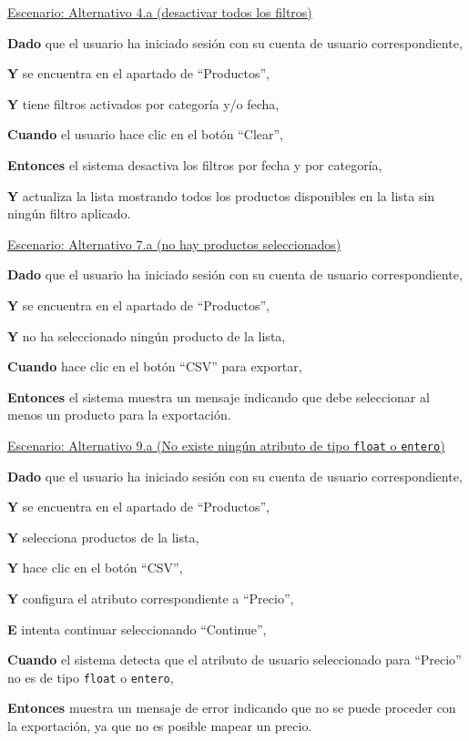 \vspace{0.20cm}

\underline{Escenario: Alternativo 4.a (desactivar todos los filtros)}\par
\vspace{0.15cm}
\textbf{Dado} que el usuario ha iniciado sesión con su cuenta de usuario correspondiente,\par
\textbf{Y} se encuentra en el apartado de \enquote{Productos},\par
\textbf{Y} tiene filtros activados por categoría y/o fecha,\par
\textbf{Cuando} el usuario hace clic en el botón \enquote{Clear},\par
\textbf{Entonces} el sistema desactiva los filtros por fecha y por categoría,\par
\textbf{Y} actualiza la lista mostrando todos los productos disponibles en la lista sin ningún filtro aplicado.\par

\vspace{0.20cm}
\newpage
\underline{Escenario: Alternativo 7.a (no hay productos seleccionados)}\par
\vspace{0.15cm}
\textbf{Dado} que el usuario ha iniciado sesión con su cuenta de usuario correspondiente,\par
\textbf{Y} se encuentra en el apartado de \enquote{Productos},\par
\textbf{Y} no ha seleccionado ningún producto de la lista,\par
\textbf{Cuando} hace clic en el botón \enquote{CSV} para exportar,\par
\textbf{Entonces} el sistema muestra un mensaje indicando que debe seleccionar al menos un producto para la exportación.\par

\vspace{0.20cm}

\underline{Escenario: Alternativo 9.a (No existe ningún atributo de tipo \texttt{float} o \texttt{entero})}\par\vspace{0.15cm}
\vspace{0.15cm}
\textbf{Dado} que el usuario ha iniciado sesión con su cuenta de usuario correspondiente,\par
\textbf{Y} se encuentra en el apartado de \enquote{Productos},\par
\textbf{Y} selecciona productos de la lista,\par
\textbf{Y} hace clic en el botón \enquote{CSV},\par
\textbf{Y} configura el atributo correspondiente a \enquote{Precio},\par
\textbf{E} intenta continuar seleccionando \enquote{Continue},\par
\textbf{Cuando} el sistema detecta que el atributo de usuario seleccionado para \enquote{Precio} no es de tipo \texttt{float} o \texttt{entero},\par
\textbf{Entonces} muestra un mensaje de error indicando que no se puede proceder con la exportación, ya que no es posible mapear un precio.\par

